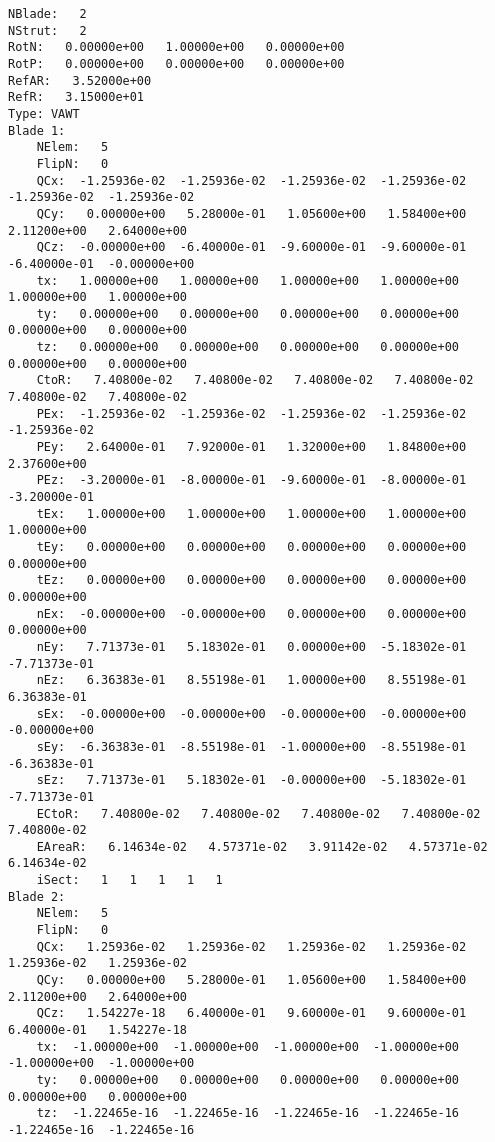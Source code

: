 \begin{lstlisting}
NBlade:   2
NStrut:   2
RotN:   0.00000e+00   1.00000e+00   0.00000e+00
RotP:   0.00000e+00   0.00000e+00   0.00000e+00
RefAR:   3.52000e+00
RefR:   3.15000e+01
Type: VAWT
Blade 1:
    NElem:   5
    FlipN:   0
    QCx:  -1.25936e-02  -1.25936e-02  -1.25936e-02  -1.25936e-02  -1.25936e-02  -1.25936e-02
    QCy:   0.00000e+00   5.28000e-01   1.05600e+00   1.58400e+00   2.11200e+00   2.64000e+00
    QCz:  -0.00000e+00  -6.40000e-01  -9.60000e-01  -9.60000e-01  -6.40000e-01  -0.00000e+00
    tx:   1.00000e+00   1.00000e+00   1.00000e+00   1.00000e+00   1.00000e+00   1.00000e+00
    ty:   0.00000e+00   0.00000e+00   0.00000e+00   0.00000e+00   0.00000e+00   0.00000e+00
    tz:   0.00000e+00   0.00000e+00   0.00000e+00   0.00000e+00   0.00000e+00   0.00000e+00
    CtoR:   7.40800e-02   7.40800e-02   7.40800e-02   7.40800e-02   7.40800e-02   7.40800e-02
    PEx:  -1.25936e-02  -1.25936e-02  -1.25936e-02  -1.25936e-02  -1.25936e-02
    PEy:   2.64000e-01   7.92000e-01   1.32000e+00   1.84800e+00   2.37600e+00
    PEz:  -3.20000e-01  -8.00000e-01  -9.60000e-01  -8.00000e-01  -3.20000e-01
    tEx:   1.00000e+00   1.00000e+00   1.00000e+00   1.00000e+00   1.00000e+00
    tEy:   0.00000e+00   0.00000e+00   0.00000e+00   0.00000e+00   0.00000e+00
    tEz:   0.00000e+00   0.00000e+00   0.00000e+00   0.00000e+00   0.00000e+00
    nEx:  -0.00000e+00  -0.00000e+00   0.00000e+00   0.00000e+00   0.00000e+00
    nEy:   7.71373e-01   5.18302e-01   0.00000e+00  -5.18302e-01  -7.71373e-01
    nEz:   6.36383e-01   8.55198e-01   1.00000e+00   8.55198e-01   6.36383e-01
    sEx:  -0.00000e+00  -0.00000e+00  -0.00000e+00  -0.00000e+00  -0.00000e+00
    sEy:  -6.36383e-01  -8.55198e-01  -1.00000e+00  -8.55198e-01  -6.36383e-01
    sEz:   7.71373e-01   5.18302e-01  -0.00000e+00  -5.18302e-01  -7.71373e-01
    ECtoR:   7.40800e-02   7.40800e-02   7.40800e-02   7.40800e-02   7.40800e-02
    EAreaR:   6.14634e-02   4.57371e-02   3.91142e-02   4.57371e-02   6.14634e-02
    iSect:   1   1   1   1   1
Blade 2:
    NElem:   5
    FlipN:   0
    QCx:   1.25936e-02   1.25936e-02   1.25936e-02   1.25936e-02   1.25936e-02   1.25936e-02
    QCy:   0.00000e+00   5.28000e-01   1.05600e+00   1.58400e+00   2.11200e+00   2.64000e+00
    QCz:   1.54227e-18   6.40000e-01   9.60000e-01   9.60000e-01   6.40000e-01   1.54227e-18
    tx:  -1.00000e+00  -1.00000e+00  -1.00000e+00  -1.00000e+00  -1.00000e+00  -1.00000e+00
    ty:   0.00000e+00   0.00000e+00   0.00000e+00   0.00000e+00   0.00000e+00   0.00000e+00
    tz:  -1.22465e-16  -1.22465e-16  -1.22465e-16  -1.22465e-16  -1.22465e-16  -1.22465e-16

\end{lstlisting}
